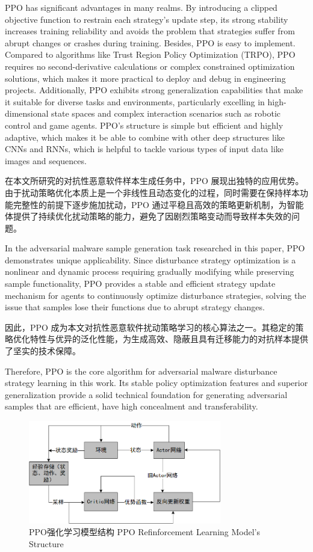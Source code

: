 PPO has significant advantages in many realms. By introducing a clipped objective function to restrain each strategy's update step, its strong stability increases training reliability and avoids the problem that strategies suffer from abrupt changes or crashes during training. Besides, PPO is easy to implement. Compared to algorithms like Trust Region Policy Optimization (TRPO), PPO requires no second-derivative calculations or complex constrained optimization solutions, which makes it more practical to deploy and debug in engineering projects. Additionally, PPO exhibits strong generalization capabilities that make it suitable for diverse tasks and environments, particularly excelling in high-dimensional state spaces and complex interaction scenarios such as robotic control and game agents. PPO's structure is simple but efficient and highly adaptive, which makes it be able to combine with other deep structures like CNNs and RNNs, which is helpful to tackle various types of input data like images and sequences.

在本文所研究的对抗性恶意软件样本生成任务中，PPO 展现出独特的应用优势。由于扰动策略优化本质上是一个非线性且动态变化的过程，同时需要在保持样本功能完整性的前提下逐步施加扰动，PPO 通过平稳且高效的策略更新机制，为智能体提供了持续优化扰动策略的能力，避免了因剧烈策略变动而导致样本失效的问题。

In the adversarial malware sample generation task researched in this paper, PPO demonstrates unique applicability. Since disturbance strategy optimization is a nonlinear and dynamic process requiring gradually modifying while preserving sample functionality, PPO provides a stable and efficient strategy update mechanism for agents to continuously optimize disturbance strategies, solving the issue that samples lose their functions due to abrupt strategy changes.

因此，PPO 成为本文对抗性恶意软件扰动策略学习的核心算法之一。其稳定的策略优化特性与优异的泛化性能，为生成高效、隐蔽且具有迁移能力的对抗样本提供了坚实的技术保障。

Therefore, PPO is the core algorithm for adversarial malware disturbance strategy learning in this work. Its stable policy optimization features and superior generalization provide a solid technical foundation for generating adversarial samples that are efficient, have high concealment and transferability.

\begin{figure}[hbt]
	\centering
	\includegraphics[width=0.75\textwidth]{figures/2.6}
	\caption{PPO强化学习模型结构 PPO Refinforcement Learning Model's Structure}\label{fig:2.6}
\end{figure}

